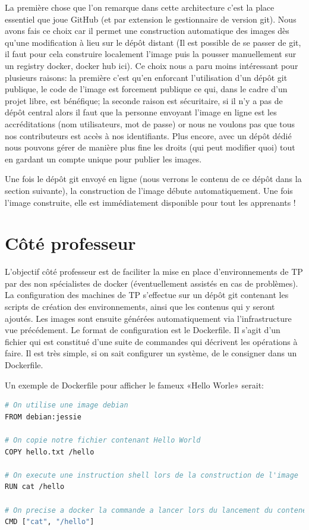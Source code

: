 \documentclass[a4paper,11pt]{report}
\begin{document}
La première chose que l'on remarque dans cette architecture c'est la place essentiel que joue GitHub (et par extension le gestionnaire de version git). Nous avons fais ce choix car il permet une construction automatique des images dès qu'une modification à lieu sur le dépôt distant (Il est possible de se passer de git, il faut pour cela construire localement l'image puis la pousser manuellement sur un registry docker, docker hub ici). Ce choix nous a paru moins intéressant pour plusieurs raisons: la première c'est qu'en enforcant l'utilisation d'un dépôt git publique, le code de l'image est forcement publique ce qui, dans le cadre d'un projet libre, est bénéfique; la seconde raison est sécuritaire, si il n'y a pas de dépôt central alors il faut que la personne envoyant l'image en ligne est les accréditations (nom utilisateurs, mot de passe) or nous ne voulons pas que tous nos contributeurs est accès à nos identifiants. Plus encore, avec un dépôt dédié nous pouvons gérer de manière plus fine les droits (qui peut modifier quoi) tout en gardant un compte unique pour publier les images.

Une fois le dépôt git envoyé en ligne (nous verrons le contenu de ce dépôt dans la section suivante), la construction de l'image débute automatiquement. Une fois l'image construite, elle est immédiatement disponible pour tout les apprenants !

\section{Côté professeur}

L'objectif côté professeur est de faciliter la mise en place d'environnements de TP par des non spécialistes de docker (éventuellement assistés en cas de problèmes).
La configuration des machines de TP s'effectue sur un dépôt git contenant les scripts de création des environnements, ainsi que les contenus qui y seront ajoutés. Les images sont ensuite générées automatiquement via l'infrastructure vue précédement.
Le format de configuration est le Dockerfile. Il s'agit d'un fichier qui est constitué d'une suite de commandes qui décrivent les opérations à faire. Il est très simple, si on sait configurer un système, de le consigner dans un Dockerfile.

Un exemple de Dockerfile pour afficher le fameux «Hello Worle» serait:

\begin{lstlisting}[language=Bash,caption={Dockerfile Hello World}]
# On utilise une image debian
FROM debian:jessie

# On copie notre fichier contenant Hello World
COPY hello.txt /hello

# On execute une instruction shell lors de la construction de l'image
RUN cat /hello

# On precise a docker la commande a lancer lors du lancement du conteneur
CMD ["cat", "/hello"]
\end{lstlisting}
\end{document}
